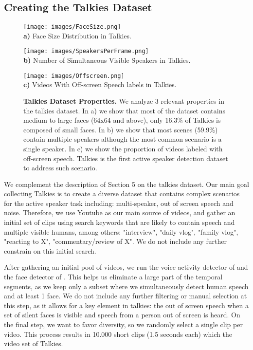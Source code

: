 \documentclass[10pt,twocolumn,letterpaper]{article}
\begin{document}
\subsection{Creating the Talkies Dataset}
\begin{figure}[h!]
    \begin{center}
        \texttt{[image: images/FaceSize.png]} \\
        \scriptsize
        \textbf{a)} Face Size Distribution in Talkies.
        
        \texttt{[image: images/SpeakersPerFrame.png]} \\
        \scriptsize
        \textbf{b)} Number of Simultaneous Visible Speakers in Talkies.
       
        \texttt{[image: images/Offscreen.png]} \\
        \scriptsize
        \textbf{c)} Videos With Off-screen Speech labels in Talkies.
    \end{center}
    \caption{\textbf{Talkies Dataset Properties.} We analyze 3 relevant properties in the talkies dataset. In a) we show that most of the dataset contains medium to large faces (64x64 and above), only 16.3\% of Talkies is composed of small faces. In b) we show that most scenes (59.9\%) contain multiple speakers although the most common scenario is a single speaker. In c) we show the proportion of videos labeled with off-screen speech. Talkies is the first active speaker detection dataset to address such scenario.
    }
    \label{fig:talkies_fig}
\end{figure} 
We complement the description of Section 5 on the talkies dataset. Our main goal collecting Talkies is  to create a diverse dataset that contains complex scenarios for the active speaker task including: multi-speaker, out of screen speech and noise. Therefore, we use Youtube as our main source of videos, and gather an initial set of clips using search keywords that are likely to contain speech and multiple visible humans, among others: "interview", "daily vlog", "family vlog", "reacting to X", "commentary/review of X". We do not include any further constrain on this initial search.

After gathering an initial pool of videos, we run the voice activity detector of \cite{wan2018generalized} and the face detector of \cite{deng2019retinaface}. This helps us eliminate a large part of the temporal segments, as we keep only a subset where we simultaneously detect human speech and at least 1 face. We do not include any further filtering or manual selection at this step, as it allows for a key element in talkies: the out of screen speech when a set of silent faces is visible and speech from a person out of screen is heard.  On the final step, we want to favor diversity, so we randomly select a single clip per video. This process results in 10.000 short clips (1.5 seconds each) which the video set of Talkies. 
\end{document}
